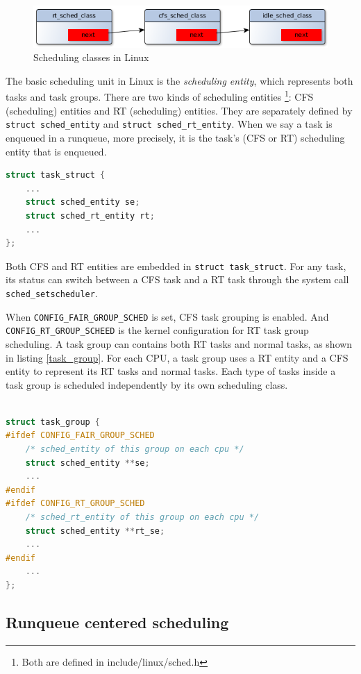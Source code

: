 \begin{figure}[htbp]
        \centering
        \includegraphics[width=\textwidth]{images/sched_classes}
        \caption{Scheduling classes in Linux}
        \label{fig:sched_classes}
\end{figure}
The basic scheduling unit in Linux is the \emph{scheduling entity},
which represents both tasks and task groups. There are two kinds of
scheduling entities \footnote{Both are defined in
  include/linux/sched.h}: CFS (scheduling) entities and RT
(scheduling) entities.  They are separately defined by \texttt{struct
  sched\_entity} and \texttt{struct sched\_rt\_entity}.  When we say a
task is enqueued in a runqueue, more precisely, it is the task's (CFS
or RT) scheduling entity that is enqueued.
\begin{lstlisting}[language=C, 
			caption={\texttt{A task embeds scheduling entities}},
			label={task_struct}]
struct task_struct {
	...
	struct sched_entity se;
	struct sched_rt_entity rt;
	...
};
\end{lstlisting}
Both CFS and RT entities are embedded in \texttt{struct task\_struct}. 
For any task, its status can switch between a CFS task and a RT task
through the system call \texttt{sched\_setscheduler}.

When \texttt{CONFIG\_FAIR\_GROUP\_SCHED} is set, CFS task grouping is
enabled. And \texttt{CONFIG\_RT\_GROUP\_SCHEED} is the kernel
configuration for RT task group scheduling. A task group can contains
both RT tasks and normal tasks, as shown in listing
\ref{task_group}. For each CPU, a task group uses a RT entity and a
CFS entity to represent its RT tasks and normal tasks.  Each type of
tasks inside a task group is scheduled independently by its own
scheduling class.
\begin{lstlisting}[language=C,
			caption={\texttt{A task group}},
			label={task_group}]		

struct task_group {
#ifdef CONFIG_FAIR_GROUP_SCHED
	/* sched_entity of this group on each cpu */
	struct sched_entity **se;
	...
#endif
#ifdef CONFIG_RT_GROUP_SCHED
	/* sched_rt_entity of this group on each cpu */
	struct sched_entity **rt_se;
	...
#endif
	...
};
\end{lstlisting}

\subsection{Runqueue centered scheduling\label{LinuxSched_rq}}


